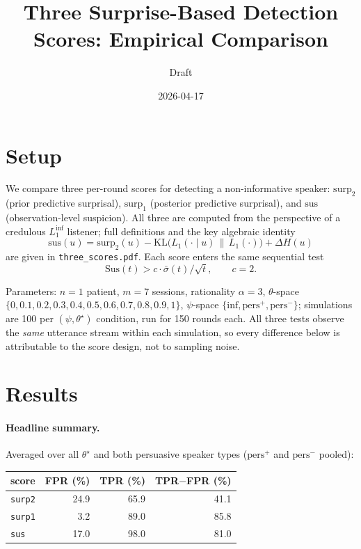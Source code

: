 \documentclass[11pt]{article}
\title{Three Surprise-Based Detection Scores: Empirical Comparison}
\author{Draft}
\date{2026-04-17}
\newcommand{\inff}{\mathrm{inf}}
\newcommand{\pers}{\mathrm{pers}}
\newcommand{\surp}{\mathrm{surp}}
\newcommand{\sus}{\mathrm{sus}}
\newcommand{\Sus}{\mathrm{Sus}}
\newcommand{\KL}{\mathrm{KL}}
\begin{document}
\maketitle

\section{Setup}

We compare three per-round scores for detecting a non-informative speaker:
$\surp_2$ (prior predictive surprisal), $\surp_1$ (posterior predictive
surprisal), and $\sus$ (observation-level suspicion).  All three are
computed from the perspective of a credulous $L_1^\inff$ listener; full
definitions and the key algebraic identity
\[
\sus(u) = \surp_2(u)
          - \KL\!\bigl(L_1(\cdot\mid u)\,\|\,L_1(\cdot)\bigr)
          + \Delta H(u)
\]
are given in \texttt{three\_scores.pdf}.  Each score enters the same
sequential test
\[
\Sus(t) > c\cdot \bar\sigma(t)/\sqrt{t},\qquad c = 2.
\]

Parameters: $n=1$ patient, $m=7$ sessions, rationality
$\alpha=3$, $\theta$-space $\{0, 0.1, 0.2, 0.3, 0.4, 0.5, 0.6, 0.7, 0.8, 0.9, 1\}$, $\psi$-space
$\{\inff,\pers^{+},\pers^{-}\}$; simulations are 100 per
$(\psi,\theta^\star)$ condition, run for 150 rounds each.
All three tests observe the \emph{same} utterance stream within each
simulation, so every difference below is attributable to the score
design, not to sampling noise.

\section{Results}

\paragraph{Headline summary.}
Averaged over all $\theta^\star$ and both persuasive speaker types
($\pers^{+}$ and $\pers^{-}$ pooled):

\begin{center}
\begin{tabular}{lrrr}
\toprule
score & FPR (\%) & TPR (\%) & TPR$-$FPR (\%) \\
\midrule
\texttt{surp2} & 24.9 & 65.9 & 41.1 \\
\texttt{surp1} & 3.2 & 89.0 & 85.8 \\
\texttt{sus} & 17.0 & 98.0 & 81.0 \\
\bottomrule
\end{tabular}
\end{center}
\end{document}
